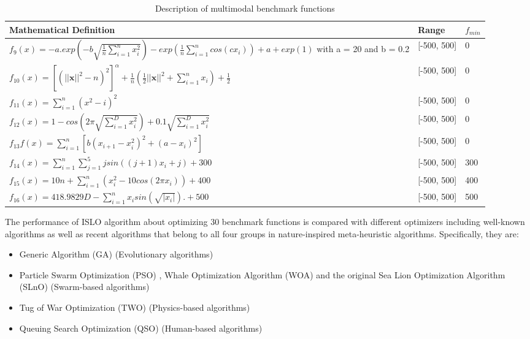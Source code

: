 \documentclass[a4paper,13pt,2p]{report}
\begin{document}
\begin{table}[!t]
\caption{Description of multimodal benchmark functions}
\label{tbl_multi_funcs}
\centering
\begin{tabular}{p{9cm} p{2cm} p{1cm}}
 \hline 
 Mathematical Definition & Range & $f_{min}$  \\ 
 \hline
$f_9(x) = -a.exp(-b\sqrt{\frac{1}{n}\sum_{i=1}^{n}x_i^2})-exp(\frac{1}{n}\sum_{i=1}^{n}cos(cx_i))+ a + exp(1)$ with a = 20 and b = 0.2 & [-500, 500] & 0 \\
$f_{10}(x) =\left[\left(||\textbf{x}||^2 - n\right)^2\right]^\alpha + \frac{1}{n}\left(\frac{1}{2}||\textbf{x}||^2+\sum_{i=1}^{n}x_i\right)+\frac{1}{2}$ & [-500, 500] & 0 \\
$f_{11}(x) =\sum_{i=1}^{n}(x^2-i)^2$ & [-500, 500] & 0 \\
$f_{12}(x)=1-cos(2\pi\sqrt{\sum_{i=1}^{D}x_i^2})+0.1\sqrt{\sum_{i=1}^{D}x_i^2}$ & [-500, 500] & 0 \\
$f_{13}f(x)=\sum_{i=1}^{n}[b (x_{i+1} - x_i^2)^ 2 + (a - x_i)^2]$ & [-500, 500] & 0 \\
$f_{14}(x) = \sum_{i=1}^{n}{\sum_{j=1}^5{j sin((j+1)x_i+j)} + 300}$ & [-500, 500] & 300 \\
$f_{15}(x)=10n + \sum_{i=1}^{n}(x_i^2 - 10cos(2\pi x_i)) + 400$ & [-500, 500] & 400 \\
$f_{16}(x) = 418.9829D -{\sum_{i=1}^{n} x_i sin(\sqrt{|x_i|})}. + 500$ & [-500, 500] & 500 \\
\hline
\end{tabular}
\end{table}

The performance of ISLO algorithm about optimizing 30 benchmark functions is compared with different optimizers including well-known algorithms as well as recent algorithms that belong to all four groups in nature-inspired meta-heuristic algorithms. Specifically, they are: 
\begin{itemize}
\item Generic Algorithm (GA) \cite{whitley1994genetic} (Evolutionary algorithms)
\item Particle Swarm Optimization (PSO) \cite{kennedy2010particle}, Whale Optimization Algorithm (WOA) \cite{mirjalili2016whale} and the original Sea Lion Optimization Algorithm (SLnO) \cite{masadeh2019sea} (Swarm-based algorithms)
\item Tug of War Optimization (TWO) \cite{kaveh2016novel} (Physics-based algorithms)
\item Queuing Search Optimization (QSO) \cite{zhang2018queuing} (Human-based algorithms)
\end{itemize}
\end{document}
